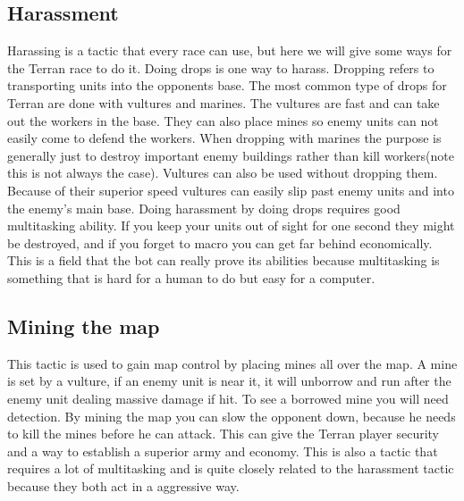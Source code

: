 	\subsection{Harassment}
		Harassing is a tactic that every race can use, but here we will give some ways for the Terran race to do it. 
		Doing drops is one way to harass. Dropping refers to transporting units into the opponents base. 
		The most common type of drops for Terran are done with vultures and marines. The vultures are fast and can take out the workers in the base. 
		They can also place mines so enemy units can not easily come to defend the workers. When dropping with marines 
		the purpose is generally just to destroy important enemy buildings rather than kill workers(note this is not always the case). 
		Vultures can also be used without dropping them. 
		Because of their superior speed vultures can easily slip past enemy units and into the enemy's main base. Doing harassment by doing drops requires 
		good multitasking ability. If you keep your units out of sight for one second they might be destroyed, 
		and if you forget to macro you can get far behind economically. 
		This is a field that the bot can really prove its abilities because 
		multitasking is something that is hard for a human to do but easy for a computer.
	
	\subsection{Mining the map}
		This tactic is used to gain map control by placing mines all over the map. A mine is set by a vulture, 
		if an enemy unit is near it, it will unborrow and run after the enemy unit dealing massive damage if hit. To see a borrowed mine you will need 
		detection. By mining the map you can slow the opponent down, because he needs to kill the mines before he can attack. 
		This can give the Terran player security and a way to establish a superior army and economy. 
		This is also a tactic that requires a lot of multitasking and is quite closely related to the harassment tactic because they both act in a 
		aggressive way.
		
	
		
		
		